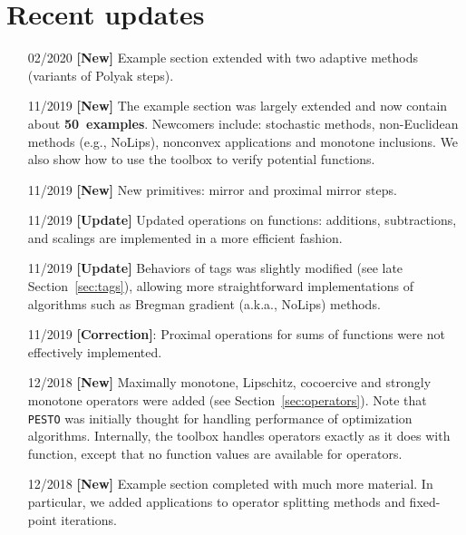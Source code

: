 \documentclass[11pt,a4paper]{article}
\begin{document}
\section*{Recent updates}
\begin{itemize}
	\item[02/2020] {\bf{}[New]} Example section extended with two adaptive methods (variants of Polyak steps).
	\item[11/2019] {\bf{}[New]} The example section was largely extended and now contain about {\bf 50~examples}. Newcomers include:  stochastic methods, non-Euclidean methods (e.g., NoLips), nonconvex applications and monotone inclusions. We also show how to use the toolbox to verify potential functions.
	\item[11/2019] {\bf{}[New]} New primitives: mirror and proximal mirror steps.
	\item[11/2019] {\bf{}[Update]} Updated operations on functions: additions, subtractions, and scalings are implemented in a more efficient fashion.
	\item[11/2019] {\bf{}[Update]} Behaviors of tags was slightly modified (see late Section~\ref{sec:tags}), allowing more straightforward implementations of algorithms such as Bregman gradient (a.k.a., NoLips) methods.
	\item[11/2019] {\bf{}[Correction]}: Proximal operations for sums of functions were not effectively implemented.
	\item[12/2018] {\bf{}[New]} Maximally monotone, Lipschitz, cocoercive and strongly monotone operators were added (see Section~\ref{sec:operators}). Note that \verb|PESTO| was initially thought for handling performance of optimization algorithms. Internally, the toolbox handles operators exactly as it does with function, except that no function values are available for operators.
	\item[12/2018] {\bf{}[New]} Example section completed with much more material. In particular, we added applications to operator splitting methods and fixed-point iterations.
\end{itemize}
\end{document}
